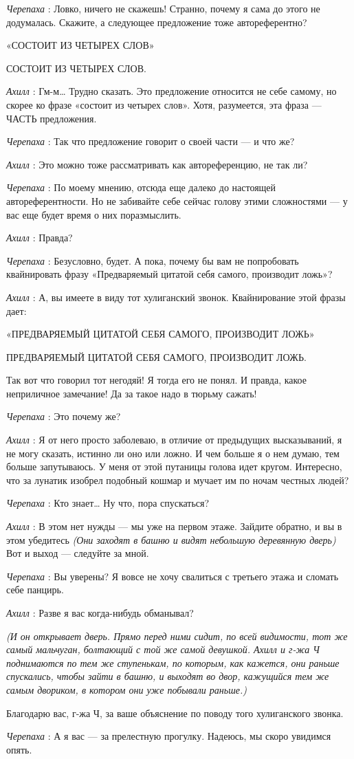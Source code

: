 \emph{Черепаха} : Ловко, ничего не скажешь! Странно, почему я сама до этого не додумалась. Скажите, а следующее предложение тоже автореферентно?

«СОСТОИТ ИЗ ЧЕТЫРЕХ СЛОВ»

СОСТОИТ ИЗ ЧЕТЫРЕХ СЛОВ.

\emph{Ахилл} : Гм-м\ldots{} Трудно сказать. Это предложение относится не себе самому, но скорее ко фразе «состоит из четырех слов». Хотя, разумеется, эта фраза --- ЧАСТЬ предложения.

\emph{Черепаха} : Так что предложение говорит о своей части --- и что же?

\emph{Ахилл} : Это можно тоже рассматривать как автореференцию, не так ли?

\emph{Черепаха} : По моему мнению, отсюда еще далеко до настоящей автореферентности. Но не забивайте себе сейчас голову этими сложностями --- у вас еще будет время о них поразмыслить.

\emph{Ахилл} : Правда?

\emph{Черепаха} : Безусловно, будет. А пока, почему бы вам не попробовать квайнировать фразу «Предваряемый цитатой себя самого, производит ложь»?

\emph{Ахилл} : А, вы имеете в виду тот хулиганский звонок. Квайнирование этой фразы дает:

«ПРЕДВАРЯЕМЫЙ ЦИТАТОЙ СЕБЯ САМОГО, ПРОИЗВОДИТ ЛОЖЬ»

ПРЕДВАРЯЕМЫЙ ЦИТАТОЙ СЕБЯ САМОГО, ПРОИЗВОДИТ ЛОЖЬ.

Так вот что говорил тот негодяй! Я тогда его не понял. И правда, какое неприличное замечание! Да за такое надо в тюрьму сажать!

\emph{Черепаха} : Это почему же?

\emph{Ахилл} : Я от него просто заболеваю, в отличие от предыдущих высказываний, я не могу сказать, истинно ли оно или ложно. И чем больше я о нем думаю, тем больше запутываюсь. У меня от этой путаницы голова идет кругом. Интересно, что за лунатик изобрел подобный кошмар и мучает им по ночам честных людей?

\emph{Черепаха} : Кто знает\ldots{} Ну что, пора спускаться?

\emph{Ахилл} : В этом нет нужды --- мы уже на первом этаже. Зайдите обратно, и вы в этом убедитесь \emph{(Они заходят в башню и видят небольшую деревянную дверь)} Вот и выход --- следуйте за мной.

\emph{Черепаха} : Вы уверены? Я вовсе не хочу свалиться с третьего этажа и сломать себе панцирь.

\emph{Ахилл} : Разве я вас когда-нибудь обманывал?

\emph{(И он открывает дверь. Прямо перед ними сидит, по всей видимости, тот же самый мальчуган, болтающий с той же самой девушкой. Ахилл и г-жа Ч поднимаются по тем же ступенькам, по которым, как кажется, они раньше спускались, чтобы зайти в башню, и выходят во двор, кажущийся тем же самым двориком, в котором они уже побывали раньше.)}

Благодарю вас, г-жа Ч, за ваше объяснение по поводу того хулиганского звонка.

\emph{Черепаха} : А я вас --- за прелестную прогулку. Надеюсь, мы скоро увидимся опять.

